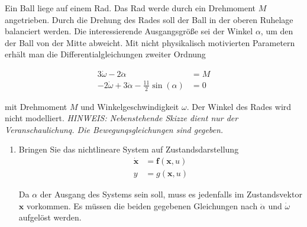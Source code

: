 \documentclass[crop=false]{standalone}
\begin{document}
\begin{task}
Ein Ball liege auf einem Rad. Das Rad werde durch ein Drehmoment $M$ angetrieben.
Durch die Drehung des Rades soll der Ball in der oberen Ruhelage balanciert werden.
Die interessierende Ausgangsgröße sei der Winkel $\alpha$, um
den der Ball von der Mitte abweicht. Mit nicht physikalisch motivierten Parametern erhält man die Differentialgleichungen zweiter Ordnung

\[ 
\begin{aligned} 3 \dot{\omega}-2 \ddot{\alpha} &=M \\-2 \dot{\omega}+3 \ddot{\alpha}-\frac{11}{2} \sin (\alpha) &=0 \end{aligned}
 \]
 
mit Drehmoment $M$ und Winkelgeschwindigkeit $\omega$. Der
Winkel des Rades wird nicht modelliert.
\emph{HINWEIS: Nebenstehende Skizze dient nur der Veranschaulichunq. Die Bewegunqsgleichungen sind gegeben.}

 \begin{enumerate}[i]
     \item Bringen Sie das nichtlineare System auf Zustandsdarstellung
     \[ 
\begin{aligned} \dot{\mathbf{x}} &=\mathbf{f}(\mathbf{x}, u) \\ y &=g(\mathbf{x}, u) \end{aligned}
 \]
 \begin{solution}
 Da $\alpha$ der Ausgang des Systems sein soll, muss es jedenfalls im Zustandsvektor $\mathbf{x}$ vorkommen.
 Es müssen die beiden gegebenen Gleichungen nach $\ddot{\alpha}$ und $\dot{\omega}$ aufgelöst werden.
 

\end{solution}
\end{enumerate}
\end{task}
\end{document}
